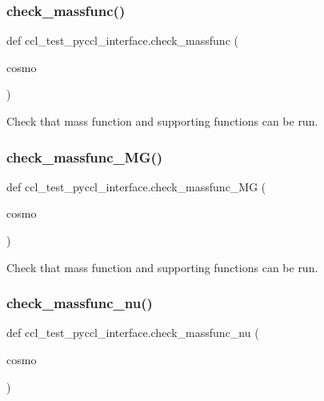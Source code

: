 \subsubsection{\texorpdfstring{check\+\_\+massfunc()}{check\_massfunc()}}
{\footnotesize\ttfamily def ccl\+\_\+test\+\_\+pyccl\+\_\+interface.\+check\+\_\+massfunc (\begin{DoxyParamCaption}\item[{}]{cosmo }\end{DoxyParamCaption})}

\begin{DoxyVerb}Check that mass function and supporting functions can be run.
\end{DoxyVerb}
 \mbox{\label{namespaceccl__test__pyccl__interface_a694d4068ccc8aba45f1fdf9772bf89cd}} 
\subsubsection{\texorpdfstring{check\+\_\+massfunc\+\_\+\+M\+G()}{check\_massfunc\_MG()}}
{\footnotesize\ttfamily def ccl\+\_\+test\+\_\+pyccl\+\_\+interface.\+check\+\_\+massfunc\+\_\+\+MG (\begin{DoxyParamCaption}\item[{}]{cosmo }\end{DoxyParamCaption})}

\begin{DoxyVerb}Check that mass function and supporting functions can be run.
\end{DoxyVerb}
 \mbox{\label{namespaceccl__test__pyccl__interface_ade98af8ec8a8309c2012c63e9a3766ae}} 
\subsubsection{\texorpdfstring{check\+\_\+massfunc\+\_\+nu()}{check\_massfunc\_nu()}}
{\footnotesize\ttfamily def ccl\+\_\+test\+\_\+pyccl\+\_\+interface.\+check\+\_\+massfunc\+\_\+nu (\begin{DoxyParamCaption}\item[{}]{cosmo }\end{DoxyParamCaption})}

